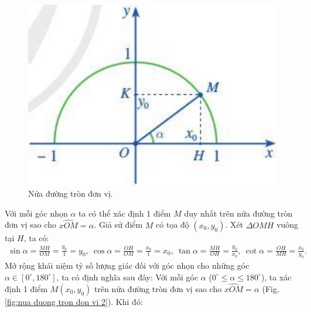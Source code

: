 \documentclass[oneside]{book}
\numberwithin{equation}{section}
\begin{document}
\begin{figure}[H]
	\centering
	\includegraphics[scale=0.2]{nua_duong_tron_don_vi_1}
	\caption{Nửa đường tròn đơn vị.}
	\label{fig:nua duong tron don vi}
\end{figure}
Với mỗi góc nhọn $\alpha$ ta có thể xác định 1 điểm $M$ duy nhất trên nửa đường tròn đơn vị sao cho $\widehat{xOM} = \alpha$. Giả sử điểm $M$ có tọa độ $(x_0,y_0)$. Xét $\Delta OMH$ vuông tại $H$, ta có:
\begin{align*}
	\sin\alpha = \frac{MH}{OM} = \frac{y_0}{1} = y_0,\ \cos\alpha = \frac{OH}{OM} = \frac{x_0}{1} = x_0,\ \tan\alpha = \frac{MH}{OH} = \frac{y_0}{x_0},\ \cot\alpha = \frac{OH}{MH} = \frac{x_0}{y_0}.
\end{align*}
Mở rộng khái niệm tỷ số lượng giác đối với góc nhọn cho những góc $\alpha\in[0^\circ,180^\circ]$, ta có định nghĩa sau đây: Với mỗi góc $\alpha$ ($0^\circ\le\alpha\le 180^\circ$), ta xác định 1 điểm $M(x_0,y_0)$ trên nửa đường tròn đơn vị sao cho $\widehat{xOM} = \alpha$ (Fig. \ref{fig:nua duong tron don vi 2}). Khi đó:
\end{document}
